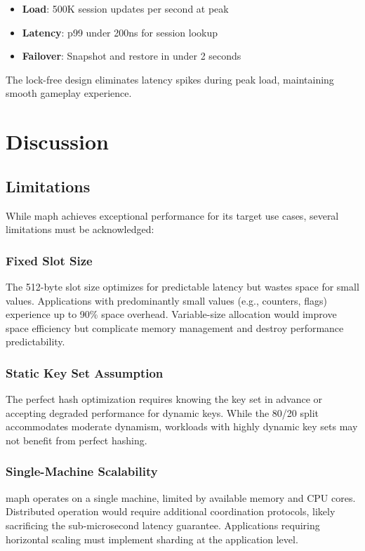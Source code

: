 \documentclass[10pt,conference]{IEEEtran}
\begin{document}
\begin{itemize}
\item \textbf{Load}: 500K session updates per second at peak
\item \textbf{Latency}: p99 under 200ns for session lookup
\item \textbf{Failover}: Snapshot and restore in under 2 seconds
\end{itemize}

The lock-free design eliminates latency spikes during peak load, maintaining smooth gameplay experience.

\section{Discussion}
\label{sec:discussion}

\subsection{Limitations}

While maph achieves exceptional performance for its target use cases, several limitations must be acknowledged:

\subsubsection{Fixed Slot Size}
The 512-byte slot size optimizes for predictable latency but wastes space for small values. Applications with predominantly small values (e.g., counters, flags) experience up to 90\% space overhead. Variable-size allocation would improve space efficiency but complicate memory management and destroy performance predictability.

\subsubsection{Static Key Set Assumption}
The perfect hash optimization requires knowing the key set in advance or accepting degraded performance for dynamic keys. While the 80/20 split accommodates moderate dynamism, workloads with highly dynamic key sets may not benefit from perfect hashing.

\subsubsection{Single-Machine Scalability}
maph operates on a single machine, limited by available memory and CPU cores. Distributed operation would require additional coordination protocols, likely sacrificing the sub-microsecond latency guarantee. Applications requiring horizontal scaling must implement sharding at the application level.
\end{document}

